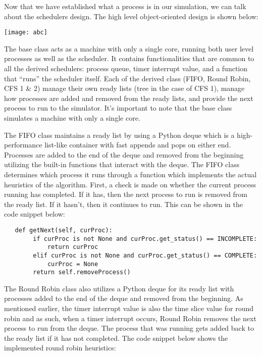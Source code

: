 \documentclass[a4paper]{article}
\begin{document}
Now that we have established what a process is in our simulation, we can talk about the schedulers design. The high level object-oriented design is shown below:


\begin{center}
\texttt{[image: abc]}
\end{center}

The base class acts as a machine with only a single core, running both user level processes as well as the scheduler. It contains functionalities that are common to all the derived schedulers: process queue, timer interrupt value, and a function that “runs” the scheduler itself. Each of the derived class (FIFO, Round Robin, CFS 1 \& 2) manage their own ready lists (tree in the case of CFS 1), manage how processes are added and removed from the ready lists, and provide the next process to run to the simulator. It’s important to note that the base class simulates a machine with only a single core.


The FIFO class maintains a ready list by using a Python deque which is a high-performance list-like container with fast appends and pops on either end. Processes are added to the end of the deque and removed from the beginning utilizing the built-in functions that interact with the deque. The FIFO class determines which process it runs through a function which implements the actual heuristics of the algorithm. First, a check is made on whether the current process running has completed. If it has, then the next process to run is removed from the ready list. If it hasn’t, then it continues to run. This can be shown in the code snippet below:


\begin{lstlisting}
   def getNext(self, curProc):
        if curProc is not None and curProc.get_status() == INCOMPLETE:
            return curProc
        elif curProc is not None and curProc.get_status() == COMPLETE:
            curProc = None
        return self.removeProcess()
\end{lstlisting}

The Round Robin class also utilizes a Python deque for its ready list with processes added to the end of the deque and removed from the beginning. As mentioned earlier, the timer interrupt value is also the time slice value for round robin and as such, when a timer interrupt occurs, Round Robin removes the next process to run from the deque. The process that was running gets added back to the ready list if it has not completed. The code snippet below shows the implemented round robin heuristics:
\end{document}
